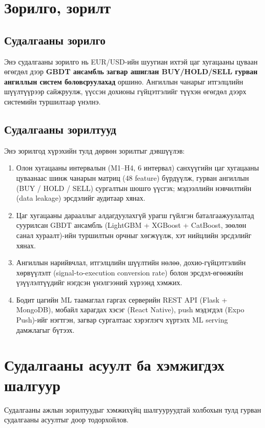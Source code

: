 \section{Зорилго, зорилт}

\subsection{Судалгааны зорилго}

Энэ судалгааны зорилго нь EUR/USD-ийн шуугиан ихтэй цаг хугацааны цуваан өгөгдөл дээр \textbf{GBDT ансамбль загвар ашиглан BUY/HOLD/SELL гурван ангиллын систем боловсруулахад} оршино. Ангиллын чанарыг итгэлцлийн шүүлтүүрээр сайжруулж, үүссэн дохионы гүйцэтгэлийг түүхэн өгөгдөл дээрх системийн туршилтаар үнэлнэ.

\subsection{Судалгааны зорилтууд}

Энэ зорилгод хүрэхийн тулд дөрвөн зорилтыг дэвшүүлэв:
\begin{enumerate}
    \item Олон хугацааны интервалын (M1--H4, 6 интервал) санхүүгийн цаг хугацааны цуваанаас шинж чанарын матриц (48 feature) бүрдүүлж, гурван ангиллын (BUY / HOLD / SELL) сургалтын шошго үүсгэх; мэдээллийн нэвчилтийн (data leakage) эрсдэлийг аудитаар хянах.
    \item Цаг хугацааны дарааллыг алдагдуулахгүй урагш гүйлгэн баталгаажуулалтад суурилсан GBDT ансамбль (LightGBM + XGBoost + CatBoost, зөөлөн санал хураалт)-ийн туршилтын орчныг хөгжүүлж, хэт нийцлийн эрсдэлийг хянах.
    \item Ангиллын нарийвчлал, итгэлцлийн шүүлтийн нөлөө, дохио-гүйцэтгэлийн хөрвүүлэлт (signal-to-execution conversion rate) болон эрсдэл-өгөөжийн үзүүлэлтүүдийг нэгдсэн үнэлгээний хүрээнд хэмжих.
    \item Бодит цагийн ML таамаглал гаргах серверийн REST API (Flask + MongoDB), мобайл харагдах хэсэг (React Native), push мэдэгдэл (Expo Push)-ийг нэгтгэн, загвар сургалтаас хэрэглэгч хүртэлх ML serving дамжлагыг бүтээх.
\end{enumerate}

\section{Судалгааны асуулт ба хэмжигдэх шалгуур}

Судалгааны ажлын зорилтуудыг хэмжихүйц шалгууруудтай холбохын тулд гурван судалгааны асуултыг доор тодорхойлов.

